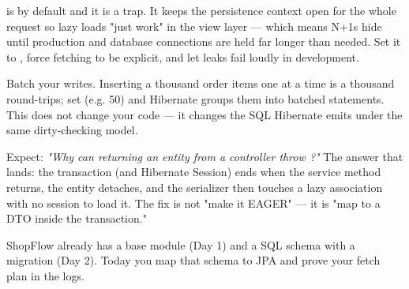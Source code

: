 \begin{perfnote}
 is  by default and it is a trap. It keeps the persistence context open for the whole request so lazy loads "just work" in the view layer --- which means N+1s hide until production and database connections are held far longer than needed. Set it to , force fetching to be explicit, and let leaks fail loudly in development.
\end{perfnote}

\begin{dbinsight}
Batch your writes. Inserting a thousand order items one  at a time is a thousand round-trips; set  (e.g. 50) and Hibernate groups them into batched statements. This does not change your code --- it changes the SQL Hibernate emits under the same dirty-checking model.
\end{dbinsight}

\begin{interview}
Expect: \emph{"Why can returning an entity from a controller throw ?"} The answer that lands: the transaction (and Hibernate Session) ends when the service method returns, the entity detaches, and the serializer then touches a lazy association with no session to load it. The fix is not "make it EAGER" --- it is "map to a DTO inside the transaction."
\end{interview}


ShopFlow already has a base module (Day 1) and a SQL schema with a migration (Day 2). Today you map that schema to JPA and prove your fetch plan in the logs.

